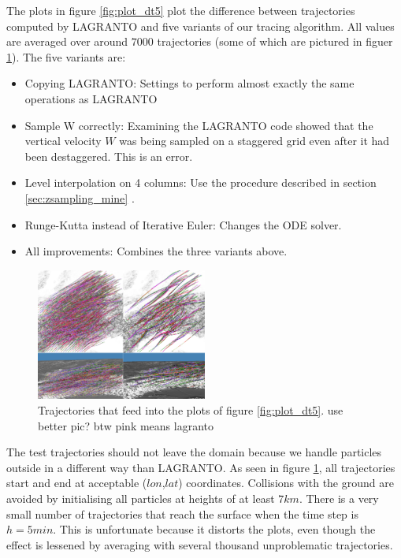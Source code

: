 The plots in figure \ref{fig:plot_dt5} plot the difference between trajectories computed by LAGRANTO and five variants of our tracing algorithm. All values are averaged over around $7000$ trajectories (some of which are pictured in figuer \ref{fig:traj_for_plot}). The five variants are:
\begin{itemize}
\item Copying LAGRANTO: Settings to perform almost exactly the same operations as LAGRANTO
\item Sample W correctly: Examining the LAGRANTO code showed that the vertical velocity $W$ was being sampled on a staggered grid even after it had been destaggered. This is an error.
\item Level interpolation on 4 columns: Use the procedure described in section \ref{sec:zsampling_mine} .
\item Runge-Kutta instead of Iterative Euler: Changes the ODE solver.
\item All improvements: Combines the three variants above.
\end{itemize}

\begin{figure}
\centering \includegraphics*[width=0.5\textwidth]{figures/trajectories_for_plots}
\caption{Trajectories that feed into the plots of figure \ref{fig:plot_dt5}. use better pic? btw pink means lagranto} %
\label{fig:traj_for_plot}
\end{figure}

The test trajectories should not leave the domain because we handle particles outside in a different way than LAGRANTO. As seen in figure \ref{fig:traj_for_plot}, all trajectories start and end at acceptable ($lon$,$lat$) coordinates. Collisions with the ground are avoided by initialising all particles at heights of at least $7 km$. There is a very small number of trajectories that reach the surface when the time step is $h = 5 min$. This is unfortunate because it distorts the plots, even though the effect is lessened by averaging with several thousand unproblematic trajectories.

